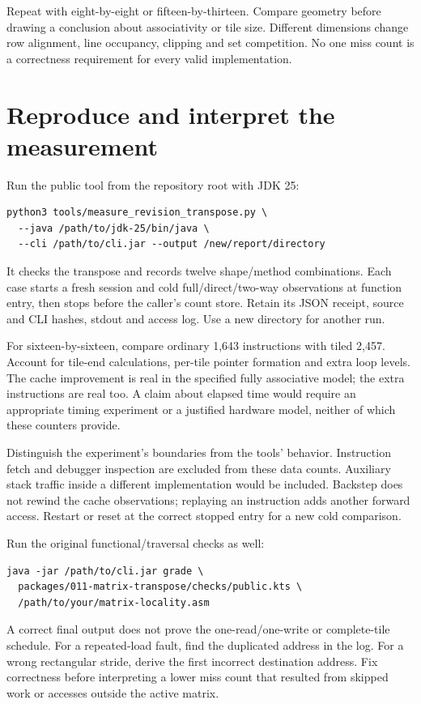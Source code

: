 

Repeat with eight-by-eight or fifteen-by-thirteen. Compare geometry before drawing
a conclusion about associativity or tile size. Different dimensions change row
alignment, line occupancy, clipping and set competition. No one miss count is a
correctness requirement for every valid implementation.

\section{Reproduce and interpret the measurement}

Run the public tool from the repository root with JDK 25:
\begin{verbatim}
python3 tools/measure_revision_transpose.py \
  --java /path/to/jdk-25/bin/java \
  --cli /path/to/cli.jar --output /new/report/directory
\end{verbatim}
It checks the transpose and records twelve shape/method combinations. Each case
starts a fresh session and cold full/direct/two-way observations at function entry,
then stops before the caller's count store. Retain its JSON receipt, source and CLI
hashes, stdout and access log. Use a new directory for another run.

For sixteen-by-sixteen, compare ordinary 1,643 instructions with tiled 2,457.
Account for tile-end calculations, per-tile pointer formation and extra loop levels.
The cache improvement is real in the specified fully associative model; the extra
instructions are real too. A claim about elapsed time would require an appropriate
timing experiment or a justified hardware model, neither of which these counters
provide.

Distinguish the experiment's boundaries from the tools' behavior. Instruction
fetch and debugger inspection are excluded from these data counts. Auxiliary
stack traffic inside a different implementation would be included. Backstep does
not rewind the cache observations; replaying an instruction adds another forward
access. Restart or reset at the correct stopped entry for a new cold comparison.

Run the original functional/traversal checks as well:
\begin{verbatim}
java -jar /path/to/cli.jar grade \
  packages/011-matrix-transpose/checks/public.kts \
  /path/to/your/matrix-locality.asm
\end{verbatim}
A correct final output does not prove the one-read/one-write or complete-tile
schedule. For a repeated-load fault, find the duplicated address in the log.
For a wrong rectangular stride, derive the first incorrect destination address.
Fix correctness before interpreting a lower miss count that resulted from skipped
work or accesses outside the active matrix.

